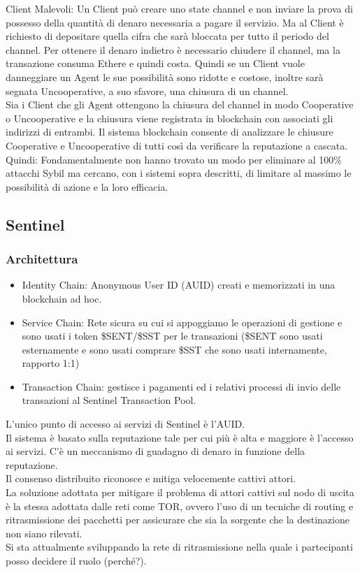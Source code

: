 \documentclass[]{article}
\begin{document}
	Client Malevoli:	Un Client può creare uno state channel e non inviare la prova di possesso della quantità di denaro necessaria a pagare il servizio. Ma al Client è richiesto di depositare quella cifra che sarà bloccata per tutto il periodo del channel. Per ottenere il denaro indietro è necessario chiudere il channel, ma la transazione consuma Ethere e quindi costa.
	Quindi se un Client vuole danneggiare un Agent le sue possibilità sono ridotte e costose, inoltre sarà segnata Uncooperative, a suo sfavore, una chiusura di un channel.\\	
	Sia i Client che gli Agent ottengono la chiusura del channel in modo Cooperative o Uncooperative e la chiusura viene registrata in blockchain con associati gli indirizzi di entrambi.
	Il sistema blockchain consente di analizzare le chiusure Cooperative e Uncooperative di tutti così da verificare la reputazione a cascata.	\\
	Quindi: Fondamentalmente non hanno trovato un modo per eliminare al 100\% attacchi Sybil ma cercano, con i sistemi sopra descritti, di limitare al massimo le possibilità di azione e la loro efficacia.
	
	\subsection{Sentinel}
	
	\subsubsection{Architettura}
	\begin{itemize}
	\item Identity Chain: Anonymous User ID (AUID) creati e memorizzati in una blockchain ad hoc.
	\item Service Chain: Rete sicura su cui si appoggiamo le operazioni di gestione e sono usati i token \$SENT/\$SST per le transazioni (\$SENT sono usati esternamente e sono usati comprare \$SST che sono usati internamente, rapporto 1:1)
	\item Transaction Chain: gestisce i pagamenti ed i relativi processi di invio delle transazioni al Sentinel Transaction Pool.
	\end{itemize}	
	L’unico punto di accesso ai servizi di Sentinel è l’AUID.\\
	Il sistema è basato sulla reputazione tale per cui più è alta e maggiore è l’accesso ai servizi. C’è un meccanismo di guadagno di denaro in funzione della reputazione.\\
	Il consenso distribuito riconosce e mitiga velocemente cattivi attori.\\
	La soluzione adottata per mitigare il problema di attori cattivi sul nodo di uscita è la stessa adottata dalle reti come TOR, ovvero l’uso di un tecniche di routing e ritrasmissione dei pacchetti per assicurare che sia la sorgente che la destinazione non siano rilevati.\\
	Si sta attualmente sviluppando la rete di ritrasmissione nella quale i partecipanti posso decidere il ruolo (perché?).	
\end{document}
